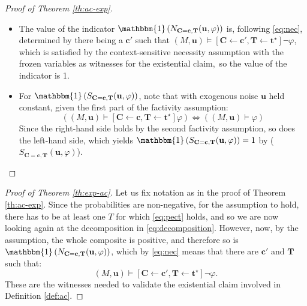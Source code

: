 \documentclass[anon,12pt]{clear2025} %
\begin{document}
\begin{proof}[Proof of Theorem \ref{th:ac-exp}]
\begin{itemize}
\item The value of the indicator $\mathbbm{1}\left(N_{\mathbf{C} = \mathbf{c}, \mathbf{T}}(\mathbf{u}, \varphi)\right)$ is, following \eqref{eq:nec}, determined by there being a $\mathbf{c'}$ such that 
$(M, \mathbf{u}) \vDash [\mathbf{C} \leftarrow \mathbf{c'}, \mathbf{T} \leftarrow \mathbf{t}^\star]\neg \varphi$, which is satisfied by the context-sensitive necessity assumption with the frozen variables as witnesses for the existential claim, so the value of the indicator is 1.

\item For $\mathbbm{1}\left(S_{\mathbf{C} = \mathbf{c}, \mathbf{T}}(\mathbf{u}, \varphi)\right)$,  note that with exogenous noise $\mathbf{u}$ held constant, given the first part of the factivity assumption:
\[\left( (M, \mathbf{u}) 
    \vDash [\mathbf{C} \leftarrow \mathbf{c}, \mathbf{T} \leftarrow \mathbf{t}^\star]\varphi \right) \Leftrightarrow \left( (M, \mathbf{u})\models \varphi\right) \] \noindent  Since the right-hand side holds by the second factivity assumption, so does the left-hand side, which yields $\mathbbm{1}\left(S_{\mathbf{C} = \mathbf{c}, \mathbf{T}}(\mathbf{u}, \varphi)\right) =1$ by \linebreak ($S_{\mathbf{C} = \mathbf{c}, \mathbf{T}}(\mathbf{u}, \varphi)$).

\end{itemize}
\end{proof}




\begin{proof}[Proof of Theorem \ref{th:exp-ac}] Let us fix notation as in the proof of Theorem \ref{th:ac-exp}.  Since the probabilities are non-negative, for the assumption to hold, there has to be at least one $T$ for which \eqref{eq:pect} holds, and so we are now looking again at the decomposition in \eqref{eq:decomposition}. However, now, by the assumption, the whole composite is positive, and therefore so is $\mathbbm{1}\left(N_{\mathbf{C} = \mathbf{c}, \mathbf{T}}(\mathbf{u}, \varphi)\right)$, which by \eqref{eq:nec} means that there are $\mathbf{c'}$ and $\mathbf{T}$ such that: 
\[
    (M, \mathbf{u}) \vDash [\mathbf{C} \leftarrow \mathbf{c'}, \mathbf{T} \leftarrow \mathbf{t}^\star]\neg \varphi.\] These are the witnesses needed to validate the existential claim involved in Definition \eqref{def:ac}.
\end{proof}
\end{document}
